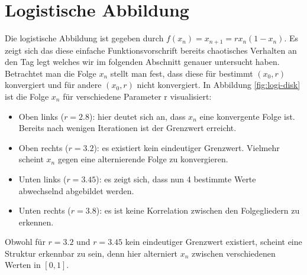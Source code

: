 \documentclass[11,5pt, twoside]{article}
\begin{document}
\section{Logistische Abbildung}
Die logistische Abbildung ist gegeben durch $f(x_n)=x_{n+1}=rx_n(1-x_n)$. Es zeigt sich das diese einfache Funktionsvorschrift 
bereits chaotisches Verhalten an den Tag legt welches wir im folgenden Abschnitt genauer untersucht haben.
\newline
Betrachtet man die Folge $x_n$ stellt man fest, dass diese für bestimmt $(x_0, r)$ konvergiert und für andere $(x_0, r)$ nicht konvergiert. In Abbildung \ref{fig:logi-disk} ist die Folge $x_n$ für verschiedene Parameter r visualisiert: 
\begin{itemize}
\item Oben links ($r=2.8$): hier deutet sich an, dass $x_n$ eine konvergente Folge ist. Bereits 
nach wenigen Iterationen ist der Grenzwert erreicht. 
\item Oben rechts ($r=3.2$): es existiert kein eindeutiger Grenzwert. Vielmehr scheint $x_n$ gegen eine alternierende Folge zu konvergieren.
\item Unten links ($r=3.45$): es zeigt sich, dass nun 4 bestimmte Werte abwechselnd abgebildet werden.
\item Unten rechts ($r=3.8$): es ist keine Korrelation zwischen den Folgegliedern zu erkennen.
\end{itemize}
Obwohl für $r=3.2$ und $r=3.45$ kein eindeutiger Grenzwert existiert, scheint eine Struktur erkennbar zu sein, denn hier alterniert $x_n$ zwischen verschiedenen Werten in $[0,1]$. 
\end{document}
